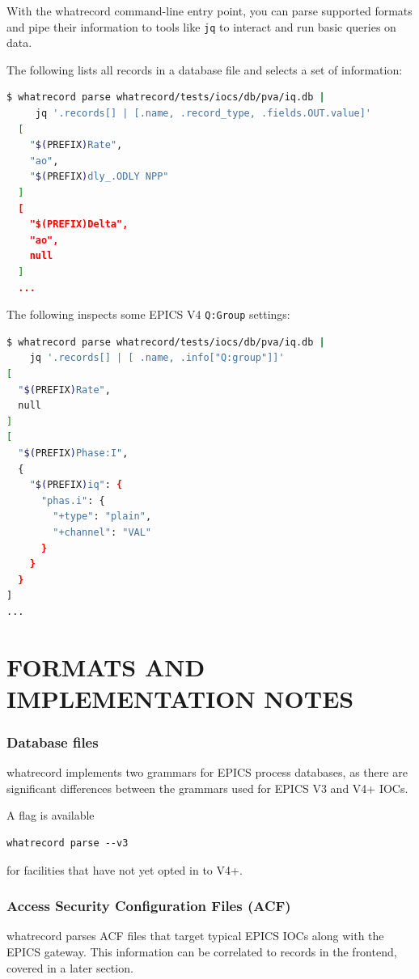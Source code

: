 \documentclass[letter,
               keeplastbox,   %
               ]{jacow}
\begin{document}
With the whatrecord command-line entry point, you can parse supported formats
and pipe their information to tools like \verb_jq_\cite{jq} to interact and run
basic queries on data.

The following lists all records in a database file and selects a set of
information:
\begin{lstlisting}[language=bash]
  $ whatrecord parse whatrecord/tests/iocs/db/pva/iq.db |
     jq '.records[] | [.name, .record_type, .fields.OUT.value]'
  [
    "$(PREFIX)Rate",
    "ao",
    "$(PREFIX)dly_.ODLY NPP"
  ]
  [
    "$(PREFIX)Delta",
    "ao",
    null
  ]
  ...
\end{lstlisting}

The following inspects some EPICS V4 \verb_Q:Group_ settings:

\begin{lstlisting}[language=bash]
$ whatrecord parse whatrecord/tests/iocs/db/pva/iq.db | 
    jq '.records[] | [ .name, .info["Q:group"]]'
[
  "$(PREFIX)Rate",
  null
]
[
  "$(PREFIX)Phase:I",
  {
    "$(PREFIX)iq": {
      "phas.i": {
        "+type": "plain",
        "+channel": "VAL"
      }
    }
  }
]
...

\end{lstlisting}

\section{FORMATS AND IMPLEMENTATION NOTES}

\subsubsection{Database files}

whatrecord implements two grammars for EPICS process databases, as there are
significant differences between the grammars used for EPICS V3 and V4+ IOCs.

A flag is available \begin{verbatim}whatrecord parse --v3\end{verbatim} for
facilities that have not yet opted in to V4+.

\subsubsection{Access Security Configuration Files (ACF)}

whatrecord parses ACF files that target typical EPICS IOCs along with
the EPICS gateway.  This information can be correlated to records in the
frontend, covered in a later section.
\end{document}
